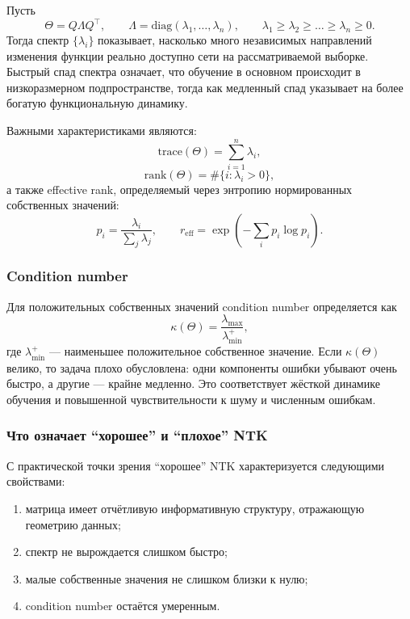 Пусть
\begin{equation}
    \Theta = Q \Lambda Q^{\top}, \qquad
    \Lambda=\mathrm{diag}(\lambda_1,\dots,\lambda_n), \qquad
    \lambda_1 \ge \lambda_2 \ge \dots \ge \lambda_n \ge 0.
\end{equation}
Тогда спектр $\{\lambda_i\}$ показывает, насколько много независимых направлений изменения функции реально доступно сети на рассматриваемой выборке. Быстрый спад спектра означает, что обучение в основном происходит в низкоразмерном подпространстве, тогда как медленный спад указывает на более богатую функциональную динамику.

Важными характеристиками являются:
\begin{equation}
    \mathrm{trace}(\Theta)=\sum_{i=1}^{n}\lambda_i,
\end{equation}
\begin{equation}
    \mathrm{rank}(\Theta)=\#\{i:\lambda_i>0\},
\end{equation}
а также effective rank, определяемый через энтропию нормированных собственных значений:
\begin{equation}
    p_i=\frac{\lambda_i}{\sum_j \lambda_j}, \qquad
    r_{\mathrm{eff}}=\exp\left(-\sum_i p_i \log p_i\right).
\end{equation}

\subsubsection{Condition number}

Для положительных собственных значений condition number определяется как
\begin{equation}
    \kappa(\Theta)=\frac{\lambda_{\max}}{\lambda_{\min}^{+}},
\end{equation}
где $\lambda_{\min}^{+}$ --- наименьшее положительное собственное значение. Если $\kappa(\Theta)$ велико, то задача плохо обусловлена: одни компоненты ошибки убывают очень быстро, а другие --- крайне медленно. Это соответствует жёсткой динамике обучения и повышенной чувствительности к шуму и численным ошибкам.

\subsubsection{Что означает ``хорошее'' и ``плохое'' NTK}

С практической точки зрения ``хорошее'' NTK характеризуется следующими свойствами:
\begin{enumerate}
    \item матрица имеет отчётливую информативную структуру, отражающую геометрию данных;
    \item спектр не вырождается слишком быстро;
    \item малые собственные значения не слишком близки к нулю;
    \item condition number остаётся умеренным.
\end{enumerate}


